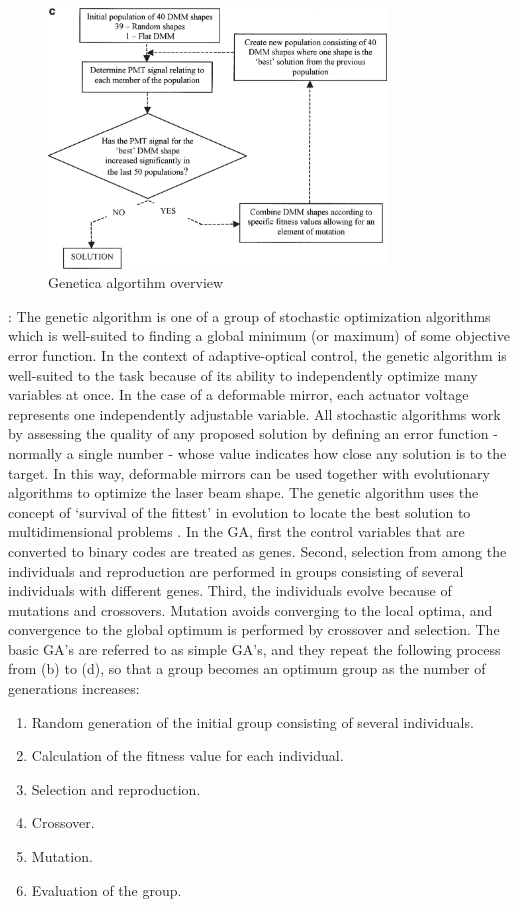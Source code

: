 \begin{figure}[htbp]
	\centering
		\includegraphics[width=0.80\textwidth]{images/genetic_algor}
	\caption{Genetica algortihm overview \cite{Genetic_compared_to_others}}
	\label{fig:genetic_algor}
\end{figure}

\cite{Genetic_closed_loop}:\newline
The genetic algorithm is one of a group of stochastic optimization algorithms which is well-suited to finding a global minimum (or maximum) of some objective error function. In the context of adaptive-optical control, the genetic algorithm is well-suited to the task because of its ability to independently optimize many variables at once. In the case of a deformable mirror, each actuator voltage represents one independently adjustable variable. All stochastic algorithms work by assessing the quality of any proposed solution by defining an error function - normally a single number - whose value indicates how close any solution is to the target. In this way, deformable mirrors can be used together with evolutionary algorithms to optimize the laser beam shape.
The genetic algorithm uses the concept of ‘survival of the fittest’ in evolution to locate the best solution to multidimensional problems . In the GA, first the control variables that are converted to binary codes are treated as genes. Second, selection from among the individuals and reproduction are performed in groups consisting of several individuals with different genes. Third, the individuals evolve because of mutations and crossovers. Mutation avoids converging to the local optima, and convergence to the global optimum is performed by crossover and selection. The basic GA’s are referred to as simple GA’s, and they repeat the following process from (b) to (d), so that a group becomes an optimum group as the number of generations increases:
\begin{enumerate}
	\item Random generation of the initial group consisting of several individuals.
	\item Calculation of the fitness value for each individual. 
	\item Selection and reproduction. 
	\item Crossover. 
	\item Mutation. 
	\item Evaluation of the group.
\end{enumerate}

